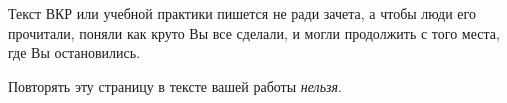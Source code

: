 \documentclass[14pt, russian]{matmex-diploma-custom}
\begin{document}

\maketitle
\setcounter{tocdepth}{2}
\tableofcontents

\pagebreak
\newfontfamily{}
\begin{center}
    \hspace{0pt}
    \vfill
    {\Huge\myfont
        Текст ВКР или учебной практики пишется не ради зачета, а чтобы люди его прочитали, поняли как круто Вы все сделали, и могли продолжить с того места, где Вы остановились.
        \vspace{2em}

        Повторять эту страницу в тексте вашей работы \emph{нельзя}.}
    \vfill
    \hspace{0pt}
\end{center}
\pagebreak








\setmonofont{CMU Typewriter Text}


\end{document}
